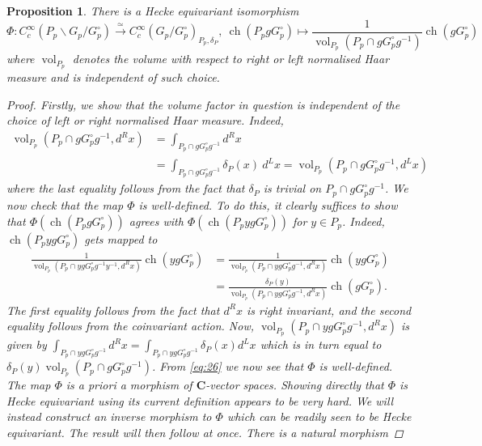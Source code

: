 \documentclass{amsart}%
\theoremstyle{plain}
\newtheorem{prop}[thm]{Proposition}
\theoremstyle{plain}
\theoremstyle{remark}
\DeclareMathOperator{\ch}{ch}
\DeclareMathOperator{\vol}{vol}
\begin{document}
\begin{prop}\label{prop from inv to coinv}
    There is a Hecke equivariant isomorphism
    $$\Phi: C_c^\infty(P_p\backslash G_p/G_p^\circ)\overset{\simeq}{\longrightarrow} C_c^\infty(G_p/G_p^\circ)_{P_p,\delta_P},\ \ch(P_pgG_p^\circ)\mapsto\frac{1}{\vol_{P_p}\left(P_p\cap g G_p^\circ g^{-1}\right)}\ch( gG_p^\circ)$$
    where $\vol_{P_p}$ denotes the volume with respect to right or left normalised Haar measure and is independent of such choice.
    \begin{proof}
    Firstly, we show that the volume factor in question is independent of the choice of left or right normalised Haar measure. Indeed, 
    \begin{align*}
        \vol_{P_p}(P_p\cap g G_p^\circ g^{-1},d^Rx)&=\int_{P_p\cap gG_p^\circ g^{-1}} d^Rx\\
        &=\int_{P_p\cap g G_p^\circ g^{-1}} \delta_P(x)\ d^Lx=\vol_{P_p}(P_p\cap g G_p^\circ g^{-1},d^Lx)
    \end{align*}
    where the last equality follows from the fact that $\delta_P$ is trivial on $P_p\cap gG_p^\circ g^{-1}$.
        We now check that the map $\Phi$ is well-defined. To do this, it clearly suffices to show that $\Phi(\ch(P_p g G_p^\circ))$ agrees with $\Phi(\ch(P_p yg G_p^\circ))$ for $y\in P_p$. Indeed, $\ch(P_p yg G_p^\circ)$ gets mapped to 
        \begin{align}\label{eq:26}
            \frac{1}{\vol_{P_p}(P_p\cap yg G_p^\circ g^{-1}y^{-1},d^Rx)}\ch(yg G_p^\circ)&=\frac{1}{\vol_{P_p}(P_p\cap yg G_p^\circ g^{-1},d^Rx)}\ch(yg G_p^\circ)\\
           \nonumber &=\frac{\delta_P(y)}{\vol_{P_p}(P_p\cap yg G_p^\circ g^{-1},d^Rx)}\ch(gG_p^\circ).
        \end{align}
        The first equality follows from the fact that $d^Rx$ is right invariant, and the second equality follows from the coinvariant action.
        Now, $\vol_{P_p}(P_p\cap yg G_p^\circ g^{-1},d^Rx)$ is given by $\int_{P_p\cap yg G_p^\circ g^{-1}} d^Rx= \int_{P_p\cap yg G_p^\circ g^{-1}} \delta_P(x) d^Lx$ which is in turn equal to $\delta_P(y) \vol_{P_p}\left(P_p\cap g G_p^\circ g^{-1}\right)$. From \eqref{eq:26} we now see that $\Phi$ is well-defined. The map $\Phi$ is a priori a morphism of $\mathbf{C}$-vector spaces.  Showing directly that $\Phi$ is Hecke equivariant using its current definition appears to be very hard. We will instead construct an inverse morphism to $\Phi$ which can be readily seen to be Hecke equivariant. The result will then follow at once. There is a natural morphism 

\end{proof}
\end{prop}
\end{document}
